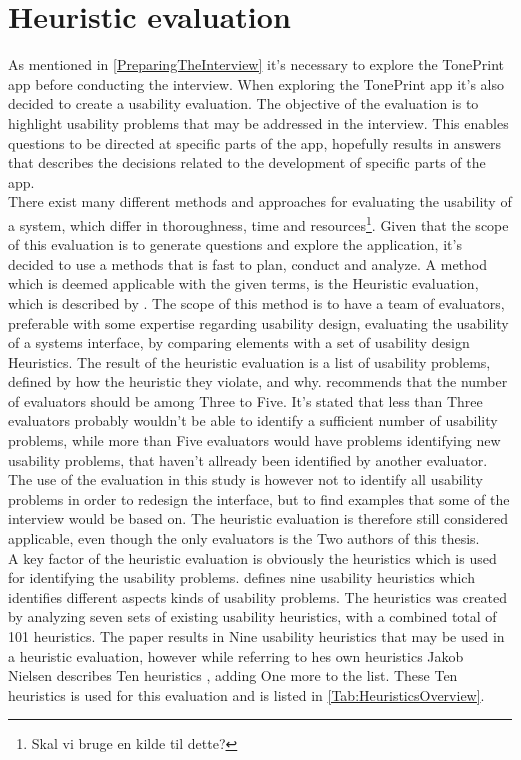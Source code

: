 \section{Heuristic evaluation}
\label{SectionHeuristicEvaluation}
As mentioned in \autoref{PreparingTheInterview} it's necessary to explore the TonePrint app before conducting the interview. When exploring the TonePrint app it's also decided to create a usability evaluation. The objective of the evaluation is to highlight usability problems that may be addressed in the interview. This enables questions to be directed at specific parts of the app, hopefully results in answers that describes the decisions related to the development of specific parts of the app. \\
There exist many different methods and approaches for evaluating the usability of a system, which differ in thoroughness, time and resources\footnote{Skal vi bruge en kilde til dette?}. Given that the scope of this evaluation is to generate questions and explore the application, it's decided to use a methods that is fast to plan, conduct and analyze. A method which is deemed applicable with the given terms, is the Heuristic evaluation, which is described by \parencite{WEB:Nielsen1994HowTo}. The scope of this method is to have a team of evaluators, preferable with some expertise regarding usability design, evaluating the usability of a systems interface, by comparing elements with a set of usability design Heuristics. The result of the heuristic evaluation is a list of usability problems, defined by how the heuristic they violate, and why. \textcite{WEB:Nielsen1994HowTo} recommends that the number of evaluators should be among Three to Five. It's stated that less than Three evaluators probably wouldn't be able to identify a sufficient number of usability problems, while more than Five evaluators would have problems identifying new usability problems, that haven't allready been identified by another evaluator. The use of the evaluation in this study is however not to identify all usability problems in order to redesign the interface, but to find examples that some of the interview would be based on. The heuristic evaluation is therefore still considered applicable, even though the only evaluators is the Two authors of this thesis.\\ 
A key factor of the heuristic evaluation is obviously the heuristics which is used for identifying the usability problems. \textcite{WEB:Nielsen1994} defines nine usability heuristics which identifies different aspects kinds of usability problems. The heuristics was created by analyzing seven sets of existing usability heuristics, with a combined total of 101 heuristics. The paper results in Nine usability heuristics that may be used in a heuristic evaluation, however while referring to hes own heuristics \parencite{WEB:Nielsen1994} Jakob Nielsen describes Ten heuristics \parencite{WEB:Nielsen1994Ten,WEB:Nielsen1994HowTo}, adding One more to the list. These Ten heuristics is used for this evaluation and is listed in \autoref{Tab:HeuristicsOverview}.

